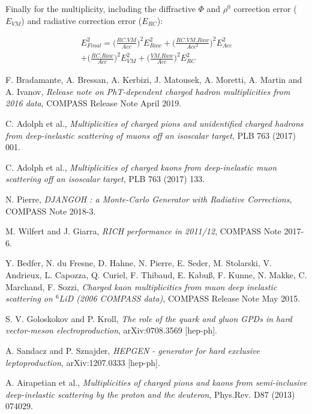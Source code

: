 \documentclass[letterpaper,12pt]{article}
\begin{document}
Finally for the multiplicity, including the diffractive $\Phi$ and $\rho^0$ correction error ($E_{VM}$) and radiative correction error ($E_{RC}$):

\begin{equation}
\begin{split}
		E^2_{Final} = \bigg( \frac{RC.VM}{Acc} \bigg)^2 E^2_{Raw} + \bigg(\frac{RC.VM.Raw}{Acc^2} \bigg)^2 E^2_{Acc} \\
		+ \bigg(\frac{RC.Raw}{Acc} \bigg)^2 E^2_{VM} + \bigg(\frac{VM.Raw}{Acc} \bigg)^2 E^2_{RC}
\end{split}
\end{equation}


\newpage

\begin{thebibliography}{99}

F. Bradamante, A. Bressan, A. Kerbizi, J. Matousek, A. Moretti, A. Martin and A. Ivanov, \textit{Release note on PhT-dependent charged hadron multiplicities from 2016 data}, COMPASS Release Note April 2019.

C. Adolph et al., \textit{Multiplicities of charged pions and unidentified charged hadrons from deep-inelastic scattering of muons off an isoscalar target}, PLB 763 (2017) 001.

C. Adolph et al., \textit{Multiplicities of charged kaons from deep-inelastic muon scattering off an isoscalar target}, PLB 763 (2017) 133.

N. Pierre, \textit{DJANGOH : a Monte-Carlo Generator with Radiative Corrections}, COMPASS Note 2018-3.

M. Wilfert and J. Giarra, \textit{RICH performance in 2011/12}, COMPASS Note 2017-6.

Y. Bedfer, N. du Fresne, D. Hahne, N. Pierre, E. Seder, M. Stolarski, V. Andrieux, L. Capozza, Q. Curiel, F. Thibaud, E. Kabu{\ss}, F. Kunne, N. Makke, C. Marchand, F. Sozzi, \textit{Charged kaon multiplicities from muon deep inelastic scattering on $^6$LiD (2006 COMPASS data)}, COMPASS Release Note May 2015.

S. V. Goloskokov and P. Kroll, \textit{The role of the quark and gluon GPDs in hard vector-meson electroproduction}, arXiv:0708.3569 [hep-ph].

A. Sandacz and P. Sznajder, \textit{HEPGEN - generator for hard exclusive leptoproduction}, arXiv:1207.0333 [hep-ph].

A. Airapetian et al., \textit{Multiplicities of charged pions and kaons from semi-inclusive deep-inelastic scattering by the proton and the deuteron}, Phys.Rev. D87 (2013) 074029.

\end{thebibliography}
\end{document}
